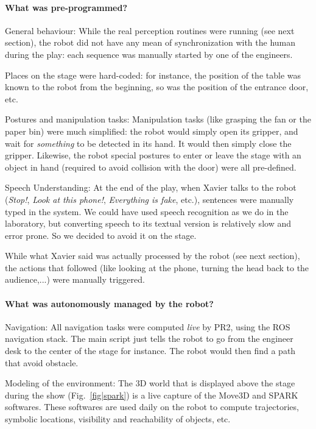 \paragraph{What was pre-programmed?}

General behaviour: While the real perception routines were running
(see next section), the robot did not have any mean of synchronization with the
human during the play: each sequence was manually started by one of the
engineers.

Places on the stage were hard-coded: for instance, the position of the table
was known to the robot from the beginning, so was the position of the entrance
door, etc.

Postures and manipulation tasks: Manipulation tasks (like grasping
the fan or the paper bin) were much simplified: the robot would simply open its
gripper, and wait for \emph{something} to be detected in its hand. It would
then simply close the gripper. Likewise, the robot special postures to enter or
leave the stage with an object in hand (required to avoid collision with the
door) were all pre-defined.

Speech Understanding: At the end of the play, when Xavier talks to
the robot (\emph{Stop!}, \emph{Look at this phone!}, \emph{Everything is fake},
etc.), sentences were manually typed in the system. We could have used speech
recognition as we do in the laboratory, but converting speech to its textual
version is relatively slow and error prone. So we decided to avoid it on the
stage.

While what Xavier said was actually processed by the robot (see next section),
the actions that followed (like looking at the phone, turning the head back to
the audience,...) were manually triggered.

\paragraph{What was autonomously managed by the robot?}

Navigation: All navigation tasks were computed \emph{live} by
PR2, using the ROS navigation stack. The main script just tells the robot to go
from the engineer desk to the center of the stage for instance. The robot would
then find a path that avoid obstacle.  

Modeling of the environment: The 3D world that is displayed above
the stage during the show (Fig.~\ref{fig|spark}) is a live capture of the
Move3D and SPARK softwares. These softwares are used daily on the robot to
compute trajectories, symbolic locations, visibility and reachability of
objects, etc.

